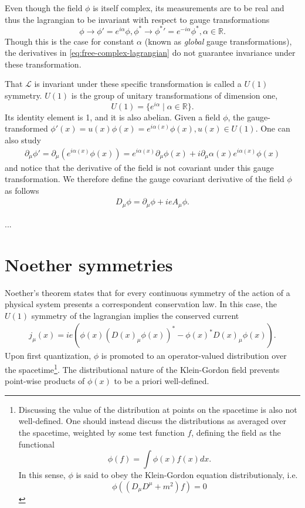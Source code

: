 Even though the field $\phi$ is itself complex, its measurements are to be real and thus the lagrangian to be invariant with respect to gauge transformations $$\phi \to \phi'= e^{i\alpha} \phi, \phi^*\to \phi^{* }'=e^{-i\alpha}\phi^*, \alpha \in \mathbb{R}.$$ Though this is the case for constant $\alpha$ (known as \textit{global} gauge transformations), the derivatives in \eqref{eq:free-complex-lagrangian} do not guarantee invariance under these transformation.

That $\mathcal{L}$ is invariant under these specific transformation is called a $U(1)$ symmetry. $U(1)$ is the group of unitary transformations of dimension one, $$U(1) = \{ e^{i\alpha} \mid \alpha \in \mathbb{R}\}.$$ Its identity element is 1, and it is also abelian. Given a field $\phi$, the gauge-transformed $\phi'(x) = u(x) \phi(x) = e^{i\alpha(x)}\phi(x), u(x) \in U(1) $. One can also study 
\begin{align}
    \partial_\mu \phi' = \partial_\mu (e^{i\alpha(x)}\phi(x)) = e^{i\alpha(x)} \partial_\mu \phi(x) + i\partial_\mu\alpha(x) e^{i\alpha(x)}\phi(x)
\end{align}
and notice that the derivative of the field is not covariant under this gauge transformation. 
We therefore define the gauge covariant derivative of the field $\phi$ as follows 
\begin{align}
D_\mu \phi = \partial_\mu \phi  + ie A_\mu \phi.
\end{align}

...

\section{Noether symmetries}
Noether's theorem states that for every continuous symmetry of the action of a physical system presents a correspondent conservation law. In this case, the $U(1)$ symmetry of the lagrangian implies the conserved current 
\begin{align}
    j_\mu(x) = ie (\phi(x) (D(x)_\mu  \phi(x))^* - \phi(x)^* D(x)_\mu \phi(x)).
    \label{eq:charge-current-density}
\end{align}
Upon first quantization, $\phi$ is promoted to an operator-valued distribution over the spacetime\footnote{Discussing the value of the distribution at points on the spacetime is also not well-defined. One should instead discuss the distributions as averaged over the spacetime, weighted by some test function $f$, defining the field as the functional $$\phi(f) = \int \phi(x)f(x)dx.$$ In this sense, $\phi$ is said to obey the Klein-Gordon equation distributionaly, i.e. $$\phi((D_\mu D^\mu + m^2) f) = 0$$}. The distributional nature of the Klein-Gordon field prevents point-wise products of $\phi(x)$ to be a priori well-defined.

